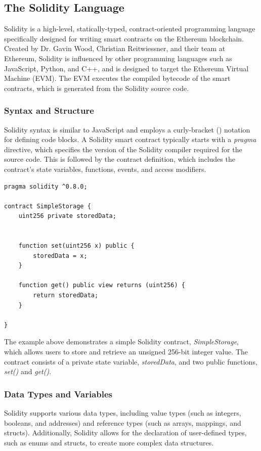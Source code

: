 \subsection{The Solidity Language}

Solidity is a high-level, statically-typed, contract-oriented programming language specifically designed for writing smart contracts on the Ethereum blockchain. Created by Dr. Gavin Wood, Christian Reitwiessner, and their team at Ethereum, Solidity is influenced by other programming languages such as JavaScript, Python, and C++, and is designed to target the Ethereum Virtual Machine (EVM). The EVM executes the compiled bytecode of the smart contracts, which is generated from the Solidity source code.

\subsubsection{Syntax and Structure}

Solidity syntax is similar to JavaScript and employs a curly-bracket ({}) notation for defining code blocks. A Solidity smart contract typically starts with a \textit{pragma} directive, which specifies the version of the Solidity compiler required for the source code. This is followed by the contract definition, which includes the contract's state variables, functions, events, and access modifiers.

\begin{verbatim}
pragma solidity ^0.8.0;

contract SimpleStorage {
    uint256 private storedData;


    function set(uint256 x) public {
        storedData = x;
    }

    function get() public view returns (uint256) {
        return storedData;
    }

}
\end{verbatim}

The example above demonstrates a simple Solidity contract, \textit{SimpleStorage}, which allows users to store and retrieve an unsigned 256-bit integer value. The contract consists of a private state variable, \textit{storedData}, and two public functions, \textit{set()} and \textit{get()}.

\subsubsection{Data Types and Variables}

Solidity supports various data types, including value types (such as integers, booleans, and addresses) and reference types (such as arrays, mappings, and structs). Additionally, Solidity allows for the declaration of user-defined types, such as enums and structs, to create more complex data structures.

